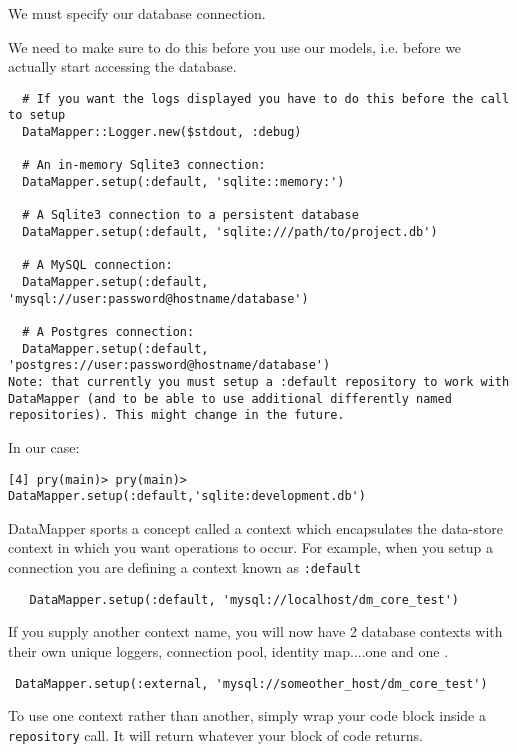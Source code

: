 
We must specify our database connection.

We need to make sure to do this before you use our models, 
i.e. before we actually start accessing the database.

\begin{verbatim}
  # If you want the logs displayed you have to do this before the call to setup
  DataMapper::Logger.new($stdout, :debug)

  # An in-memory Sqlite3 connection:
  DataMapper.setup(:default, 'sqlite::memory:')

  # A Sqlite3 connection to a persistent database
  DataMapper.setup(:default, 'sqlite:///path/to/project.db')

  # A MySQL connection:
  DataMapper.setup(:default, 'mysql://user:password@hostname/database')

  # A Postgres connection:
  DataMapper.setup(:default, 'postgres://user:password@hostname/database')
Note: that currently you must setup a :default repository to work with DataMapper (and to be able to use additional differently named repositories). This might change in the future.
\end{verbatim}

In our case:

\begin{verbatim}
[4] pry(main)> pry(main)> DataMapper.setup(:default,'sqlite:development.db')
\end{verbatim}


DataMapper sports a concept called a context which encapsulates the
data-store context in which you want operations to occur. For example,
when you setup a connection you are defining a
context known as \verb|:default|

\begin{verbatim}
   DataMapper.setup(:default, 'mysql://localhost/dm_core_test')
\end{verbatim}
If you supply another context name, you will now have 2 database contexts
with their own unique loggers, connection pool, identity map....one
 and one .

\begin{verbatim}
 DataMapper.setup(:external, 'mysql://someother_host/dm_core_test')
\end{verbatim}
To use one context rather than another, simply wrap your code block inside
a \verb|repository| call. It will return whatever your block of code returns.

